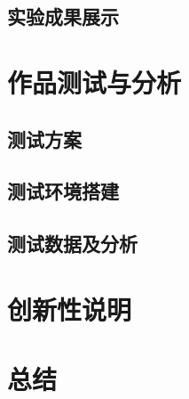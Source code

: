 \documentclass[12pt,a4paper]{ctexart}
\numberwithin{figure}{section}
\begin{document}
\subsection{实验成果展示}
\section{作品测试与分析}
\subsection{测试方案}
\subsection{测试环境搭建}
\subsection{测试数据及分析}
\section{创新性说明}
\section{总结}
\clearpage
\pagestyle{refStyle}


\end{document}
